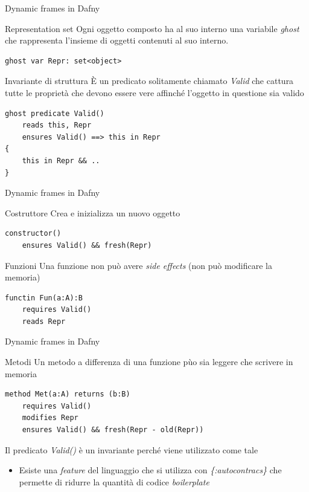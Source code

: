 \documentclass[]{beamer}
\begin{document}
\begin{frame}[containsverbatim]{Dynamic frames in Dafny}
    \begin{block}{Representation set}
        Ogni oggetto composto ha al suo interno una variabile \textit{ghost} che rappresenta l'insieme di oggetti contenuti al suo interno.\\
    \lstset{linewidth=10cm}
    \begin{lstlisting}
ghost var Repr: set<object>
\end{lstlisting}
\end{block}
\begin{block}{Invariante di struttura}
    È un predicato solitamente chiamato \textit{Valid} che cattura tutte le proprietà che devono essere vere affinché l'oggetto in questione sia valido
\lstset{linewidth=10cm}
\begin{lstlisting}
ghost predicate Valid()
    reads this, Repr
    ensures Valid() ==> this in Repr
{
    this in Repr && ..
}
\end{lstlisting}   
\end{block}
\end{frame}

\begin{frame}[containsverbatim]{Dynamic frames in Dafny}
    \begin{block}{Costruttore}
        Crea e inizializza un nuovo oggetto
\lstset{linewidth=10cm}
\begin{lstlisting}
constructor()
    ensures Valid() && fresh(Repr)
\end{lstlisting}   
    \end{block}
    \begin{block}{Funzioni}
        Una funzione non può avere \textit{side effects} (non può modificare la memoria)
\lstset{linewidth=10cm}
\begin{lstlisting}
functin Fun(a:A):B
    requires Valid()
    reads Repr
\end{lstlisting}
    \end{block}
\end{frame}

\begin{frame}[containsverbatim]{Dynamic frames in Dafny}
     \begin{block}{Metodi}
     Un metodo a differenza di una funzione pùo sia leggere che scrivere in memoria
\lstset{linewidth=10cm}
\begin{lstlisting}
method Met(a:A) returns (b:B)
    requires Valid()
    modifies Repr
    ensures Valid() && fresh(Repr - old(Repr))
\end{lstlisting}
Il predicato \textit{Valid()} è un invariante perché viene utilizzato come tale
    \end{block}
    \begin{itemize}
        \item Esiste una \textit{feature} del linguaggio che si utilizza con \textit{\{:autocontracs\}} che permette di ridurre la quantità di codice \textit{boilerplate}
    \end{itemize}
\end{frame}
\end{document}

